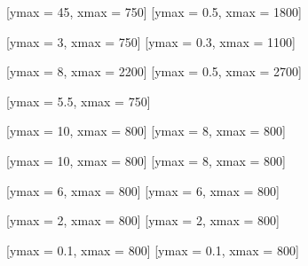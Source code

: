 \documentclass[tikz]{standalone}
\begin{document}
[ymax =  45, xmax = 750]
[ymax = 0.5, xmax = 1800]

[ymax =   3, xmax = 750]
[ymax = 0.3, xmax = 1100]

[ymax =   8, xmax = 2200]
[ymax = 0.5, xmax = 2700]

[ymax = 5.5, xmax =  750]

[ymax = 10, xmax = 800]
[ymax = 8, xmax = 800]

[ymax = 10, xmax = 800]
[ymax = 8, xmax = 800]

[ymax = 6, xmax = 800]
[ymax = 6, xmax = 800]

[ymax = 2, xmax = 800]
[ymax = 2, xmax = 800]

[ymax = 0.1, xmax = 800]
[ymax = 0.1, xmax = 800]

\end{document}
